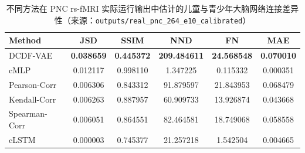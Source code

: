 \begin{table}[!htb]
\centering
\caption{DCDF-VAE 各模块的实际消融运行结果（Lorenz-96 快速消融，来源：\texttt{outputs/synthetic\_final/ablation}）}
\label{tab:dcdf_vae_ablation_actual}
\end{table}

\begin{table}[h]
  \caption{不同方法在 PNC rs-fMRI 实际运行输出中估计的儿童与青少年大脑网络连接差异性（来源：\texttt{outputs/real\_pnc\_264\_e10\_calibrated}）}
  \label{tab:difference_actual}
  \centering
  \begin{tabular}{l|c|c|c|c|c}
    \hline
    Method & JSD & SSIM & NND & FN & MAE \\
    \hline
    DCDF-VAE & \textbf{0.038659} & \textbf{0.445372} & \textbf{209.484611} & \textbf{24.568548} & \textbf{0.070010} \\
    cMLP & 0.012117 & 0.998110 & 1.347225 & 0.115332 & 0.000351 \\
    Pearson-Corr & 0.006306 & 0.843312 & 91.879597 & 21.843953 & 0.068479 \\
    Kendall-Corr & 0.006263 & 0.887957 & 60.909733 & 13.926874 & 0.043668 \\
    Spearman-Corr & 0.006051 & 0.864551 & 82.464581 & 18.749068 & 0.058558 \\
    cLSTM & 0.000003 & 0.745377 & 21.257218 & 1.542504 & 0.004665 \\
    \hline
  \end{tabular}
\end{table}

